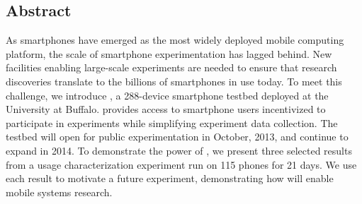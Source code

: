 \subsection*{Abstract}

As smartphones have emerged as the most widely deployed mobile computing
platform, the scale of smartphone experimentation has lagged behind. New
facilities enabling large-scale experiments are needed to ensure that
research discoveries translate to the billions of smartphones in use today.
To meet this challenge, we introduce \PhoneLab{}, a 288-device smartphone
testbed deployed at the University at Buffalo. \PhoneLab{} provides access to
smartphone users incentivized to participate in experiments while simplifying
experiment data collection. The testbed will open for public experimentation
in October, 2013, and continue to expand in 2014. To demonstrate the power of
\PhoneLab{}, we present three selected results from a usage characterization
experiment run on 115 phones for 21 days. We use each result to motivate a
future \PhoneLab{} experiment, demonstrating how \PhoneLab{} will enable
mobile systems research.
